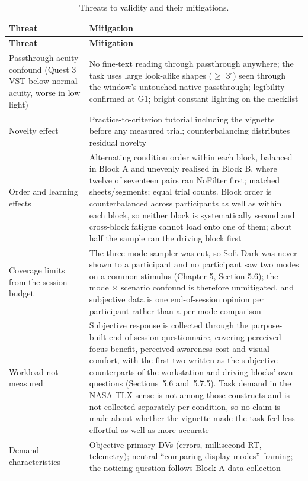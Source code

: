 \begin{longtable}{p{}|p{}}
\caption{Threats to validity and their mitigations.}\\
\hline
\textbf{Threat} & \textbf{Mitigation} \\
\hline
\endfirsthead
\hline
\textbf{Threat} & \textbf{Mitigation} \\
\hline
\endhead
\hline
Passthrough acuity confound (Quest 3 VST below normal acuity, worse in low light) & No fine-text reading through passthrough anywhere; the task uses large look-alike shapes ($\geq$ 3$^{\circ}$) seen through the window's untouched native passthrough; legibility confirmed at G1; bright constant lighting on the checklist \\
Novelty effect & Practice-to-criterion tutorial including the vignette before any measured trial; counterbalancing distributes residual novelty \\
Order and learning effects & Alternating condition order within each block, balanced in Block A and unevenly realised in Block B, where twelve of seventeen pairs ran NoFilter first; matched sheets/segments; equal trial counts. Block order is counterbalanced across participants as well as within each block, so neither block is systematically second and cross-block fatigue cannot load onto one of them; about half the sample ran the driving block first \\
Coverage limits from the session budget & The three-mode sampler was cut, so Soft Dark was never shown to a participant and no participant saw two modes on a common stimulus (Chapter 5, Section 5.6); the mode $\times$ scenario confound is therefore unmitigated, and subjective data is one end-of-session opinion per participant rather than a per-mode comparison \\
Workload not measured & Subjective response is collected through the purpose-built end-of-session questionnaire, covering perceived focus benefit, perceived awareness cost and visual comfort, with the first two written as the subjective counterparts of the workstation and driving blocks' own questions (Sections~5.6 and~5.7.5). Task demand in the NASA-TLX sense is not among those constructs and is not collected separately per condition, so no claim is made about whether the vignette made the task feel less effortful as well as more accurate \\
Demand characteristics & Objective primary DVs (errors, millisecond RT, telemetry); neutral ``comparing display modes'' framing; the noticing question follows Block A data collection \\

\end{longtable}
